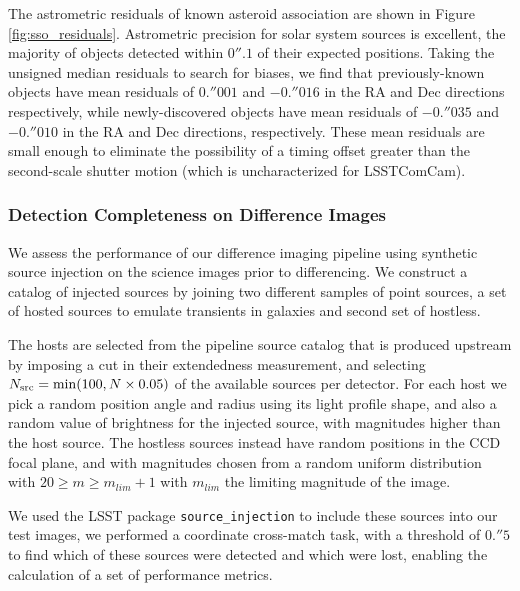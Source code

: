 The astrometric residuals of known asteroid association are shown in Figure \ref{fig:sso_residuals}.  Astrometric precision for solar system sources is excellent, the majority of objects detected within $0''.1$ of their expected positions. Taking the unsigned median residuals to search for biases, we find that previously-known objects have mean residuals of $0.''001$ and $-0.''016$ in the RA and Dec directions respectively, while newly-discovered objects have mean residuals of $-0.''035$ and $-0.''010$ in the RA and Dec directions, respectively. These mean residuals are small enough to eliminate the possibility of a timing offset greater than the second-scale shutter motion (which is uncharacterized for LSSTComCam).

\subsubsection{Detection Completeness on Difference Images} \label{sec:perf:dia_completeness}

We assess the performance of our difference imaging pipeline using synthetic source injection on the science images prior to differencing.
We construct a catalog of injected sources by joining two different samples of point sources, a set of hosted sources to emulate transients in galaxies and second set of hostless.

The hosts are selected from the pipeline source catalog that is produced upstream by imposing a cut in their extendedness measurement, and selecting $N_{\rm src}={\rm min}(100, N\times0.05)$ of the available sources per detector. 
%
%
For each host we pick a random position angle and radius using its light profile shape, and also a random value of brightness for the injected source, with magnitudes higher than the host source.
The hostless sources instead have random positions in the CCD focal plane, and with magnitudes chosen from a random uniform distribution with $20 \geq m \geq m_{lim} + 1$  with $m_{lim}$ the limiting magnitude of the image.

We used the LSST package \texttt{source\_injection} to include these sources into our test images, we performed a coordinate cross-match task, with a threshold of $0.''5$ to find which of these sources were detected and which were lost, enabling the calculation of a set of performance metrics.

